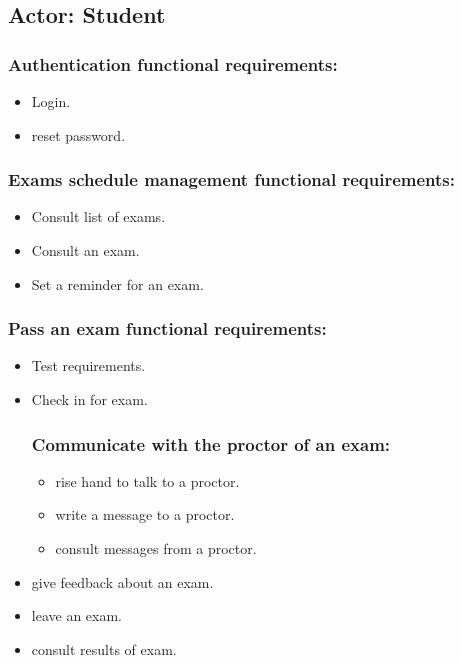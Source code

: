 \documentclass[a4paper,12p]{article}
\begin{document}
     \subsection{Actor: Student}
     \begin{itemize}
     \subsubsection{Authentication functional requirements:}
     \begin{itemize}
         \item Login.
         \item reset password.
     \end{itemize}

     \subsubsection{Exams schedule management functional requirements:}
     \begin{itemize}
         \item Consult list of exams.
         \item Consult an exam.
         \item Set a reminder for an exam.
     \end{itemize}

     \subsubsection{Pass an exam functional requirements:}
     \begin{itemize}
         \item Test requirements.
         \item Check in for exam.
         \subsubsection{Communicate with the proctor of an exam:}
         \begin{itemize}
             \item rise hand to talk to a proctor.
             \item write a message to a proctor.
             \item consult messages from a proctor.
         \end{itemize}

         \item give feedback about an exam.
         \item leave an exam.
         \item consult results of exam.
     \end{itemize}


\end{itemize}
\end{document}

